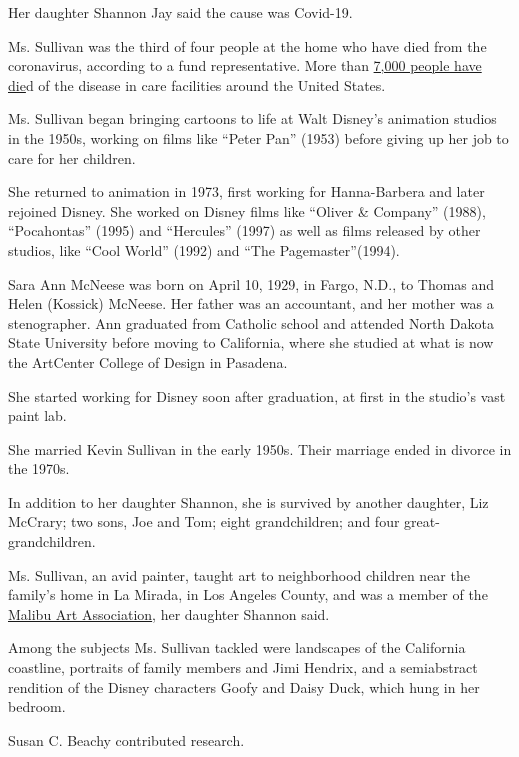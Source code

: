 Her daughter Shannon Jay said the cause was Covid-19.

Ms. Sullivan was the third of four people at the home who have died from
the coronavirus, according to a fund representative. More than
\href{https://www.nytimes.com/2020/04/17/us/coronavirus-nursing-homes.html}{7,000
people have die}d of the disease in care facilities around the United
States.

Ms. Sullivan began bringing cartoons to life at Walt Disney's animation
studios in the 1950s, working on films like ``Peter Pan'' (1953) before
giving up her job to care for her children.

She returned to animation in 1973, first working for Hanna-Barbera and
later rejoined Disney. She worked on Disney films like ``Oliver \&
Company'' (1988), ``Pocahontas'' (1995) and ``Hercules'' (1997) as well
as films released by other studios, like ``Cool World'' (1992) and ``The
Pagemaster''(1994).

Sara Ann McNeese was born on April 10, 1929, in Fargo, N.D., to Thomas
and Helen (Kossick) McNeese. Her father was an accountant, and her
mother was a stenographer. Ann graduated from Catholic school and
attended North Dakota State University before moving to California,
where she studied at what is now the ArtCenter College of Design in
Pasadena.

She started working for Disney soon after graduation, at first in the
studio's vast paint lab.

She married Kevin Sullivan in the early 1950s. Their marriage ended in
divorce in the 1970s.

In addition to her daughter Shannon, she is survived by another
daughter, Liz McCrary; two sons, Joe and Tom; eight grandchildren; and
four great-grandchildren.

Ms. Sullivan, an avid painter, taught art to neighborhood children near
the family's home in La Mirada, in Los Angeles County, and was a member
of the \href{https://malibuartassociation.com/}{Malibu Art Association},
her daughter Shannon said.

Among the subjects Ms. Sullivan tackled were landscapes of the
California coastline, portraits of family members and Jimi Hendrix, and
a semiabstract rendition of the Disney characters Goofy and Daisy Duck,
which hung in her bedroom.

Susan C. Beachy contributed research.

\href{https://www.nytimes.com/interactive/2020/obituaries/people-died-coronavirus-obituaries.html?action=click\&pgtype=Article\&state=default\&region=BELOW_MAIN_CONTENT\&context=covid_obits_promo}{}

